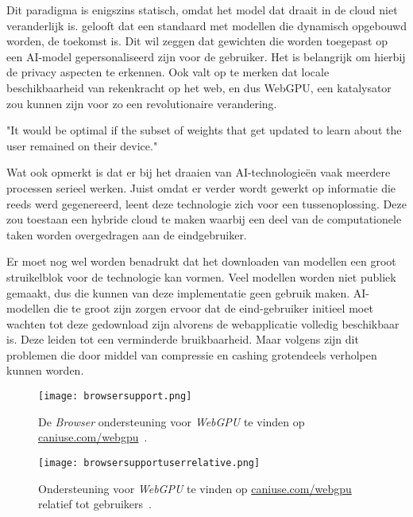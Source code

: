 \bigbreak{}

Dit paradigma is enigszins statisch, omdat het model dat draait in de cloud niet veranderlijk is. \textcite{Fleetwood2022} gelooft dat een standaard met modellen die dynamisch opgebouwd worden, de toekomst is. Dit wil zeggen dat gewichten die worden toegepast op een AI-model gepersonaliseerd zijn voor de gebruiker. Het is belangrijk om hierbij de privacy aspecten te erkennen. Ook valt op te merken dat locale beschikbaarheid van rekenkracht op het web, en dus WebGPU, een katalysator zou kunnen zijn voor zo een revolutionaire verandering.

\begin{displayquote}
    "It would be optimal if the subset of weights that get updated to learn about the user remained on their device."
\end{displayquote}

Wat \textcite{Fleetwood2022} ook opmerkt is dat er bij het draaien van  AI-technologieën vaak meerdere processen serieel werken. Juist omdat er verder wordt gewerkt op informatie die reeds werd gegenereerd, leent deze technologie zich voor een tussenoplossing. Deze zou toestaan een hybride cloud te maken waarbij een deel van de computationele taken worden overgedragen aan de eindgebruiker.

\bigbreak{}

Er moet nog wel worden benadrukt dat het downloaden van modellen een groot struikelblok voor de technologie kan vormen. Veel modellen worden niet publiek gemaakt, dus die kunnen van deze implementatie geen gebruik maken. AI-modellen die te groot zijn zorgen ervoor dat de eind-gebruiker initieel moet wachten tot deze gedownload zijn alvorens de webapplicatie volledig beschikbaar is. Deze leiden tot een verminderde bruikbaarheid. Maar volgens \textcite{Fleetwood2022} zijn dit problemen die door middel van compressie en cashing grotendeels verholpen kunnen worden.

\break{}

\begin{figure}
    \texttt{[image: browsersupport.png]}
    \caption[Ondersteuning voor \textit{WebGPU}~\autocite{Deveria2024}]{
        De \textit{Browser} ondersteuning voor \textit{WebGPU} te vinden op \href{https://caniuse.com/webgpu}{caniuse.com/webgpu}~\autocite{Deveria2024}.
    }
    \label{fig:Browser Support}
\end{figure}

\begin{figure}
    \texttt{[image: browsersupportuserrelative.png]}
    \caption[\textit{Browser} gebruiker toegang tot \textit{WebGPU}~\autocite{Deveria2024}]{
        Ondersteuning voor \textit{WebGPU} te vinden op \href{https://caniuse.com/webgpu}{caniuse.com/webgpu} relatief tot gebruikers~\autocite{Deveria2024}.
    }
    \label{fig:Relative Browser Support}
\end{figure}

